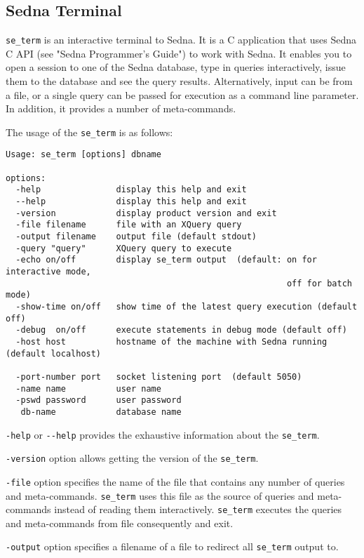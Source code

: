 \documentclass[a4paper,12pt]{article}
\begin{document}
\subsection{Sedna Terminal}
\label{terminal}
\verb!se_term! is an interactive terminal to Sedna. It is a C application that uses Sedna C API (see "Sedna Programmer's Guide") to work with Sedna. It enables you to open a session to one of the Sedna database, type in queries interactively, issue them to the database and see the query results. Alternatively, input can be from a file, or a single query can be passed for execution as a command line parameter.
In addition, it provides a number of meta-commands.

The usage of the \verb!se_term! is as follows:

\begin{verbatim}
Usage: se_term [options] dbname

options:
  -help			      display this help and exit
  --help		      display this help and exit
  -version		      display product version and exit
  -file filename	  file with an XQuery query
  -output filename	  output file (default stdout)
  -query "query"	  XQuery query to execute
  -echo on/off		  display se_term output  (default: on for interactive mode,
                                                        off for batch mode)
  -show-time on/off	  show time of the latest query execution (default off)
  -debug  on/off      execute statements in debug mode (default off)
  -host host		  hostname of the machine with Sedna running (default localhost)

  -port-number port	  socket listening port  (default 5050)
  -name name		  user name
  -pswd password	  user password
   db-name		      database name
\end{verbatim}

\verb!-help! or \verb!--help! provides the exhaustive information about the \verb!se_term!.

\verb!-version! option allows getting the version of the \verb!se_term!.

\verb!-file! option specifies the name of the file that contains any number of queries and meta-commands. \verb!se_term! uses this file as the source of queries and meta-commands instead of reading them interactively. \verb!se_term! executes the queries and meta-commands from file consequently and exit.

\verb!-output! option specifies a filename of a file to redirect all \verb!se_term! output to.
\end{document}

